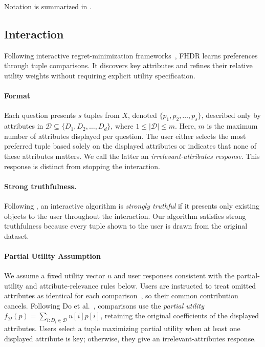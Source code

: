 \documentclass[conference]{IEEEtran}
\theoremstyle{definition}
\theoremstyle{plain}
\newcommand{\technicalreport}{\iftoggle{LinkTechnicalReport}{\href{https://github.com/JunyuLiao/High-dimensional-Regret-Minimization/blob/main/docs/TechnicalReport.pdf}{technical report}}{technical report}}
\begin{document}
Notation is summarized in \iftoggle{TechnicalReport}{Section~\ref{appen:summary} of the \technicalreport}{Appendix~\ref{appen:summary}}.

\subsection{Interaction}

Following interactive regret-minimization frameworks~\cite{NL12, XCL19, WWX21, CW23}, FHDR learns preferences through tuple comparisons. It discovers key attributes and refines their relative utility weights without requiring explicit utility specification.

\paragraph{Format}
Each question presents $s$ tuples from $X$, denoted $\{p_1,p_2,\dots,p_s\}$, described only by attributes in $\mathcal{D}\subseteq\{D_1,D_2,\dots,D_d\}$, where $1\leq\lvert\mathcal{D}\rvert\leq m$. Here, $m$ is the maximum number of attributes displayed per question. The user either selects the most preferred tuple based solely on the displayed attributes or indicates that none of these attributes matters. We call the latter an \textit{irrelevant-attributes response}. This response is distinct from stopping the interaction.

\paragraph{Strong truthfulness.}
Following \cite{XCL19}, an interactive algorithm is \emph{strongly truthful} if it presents only existing objects to the user throughout the interaction. Our algorithm satisfies strong truthfulness because every tuple shown to the user is drawn from the original dataset.

\paragraph{Partial Utility Assumption}\label{par}
We assume a fixed utility vector $u$ and user responses consistent with the partial-utility and attribute-relevance rules below. Users are instructed to treat omitted attributes as identical for each comparison~\cite{chan2024vaccine}, so their common contribution cancels. Following Do et al.~\cite{LA25}, comparisons use the \textit{partial utility} $f_\mathcal{D}(p)=\sum_{i:D_i\in\mathcal{D}}u[i]p[i]$, retaining the original coefficients of the displayed attributes. Users select a tuple maximizing partial utility when at least one displayed attribute is key; otherwise, they give an irrelevant-attributes response.
\end{document}
